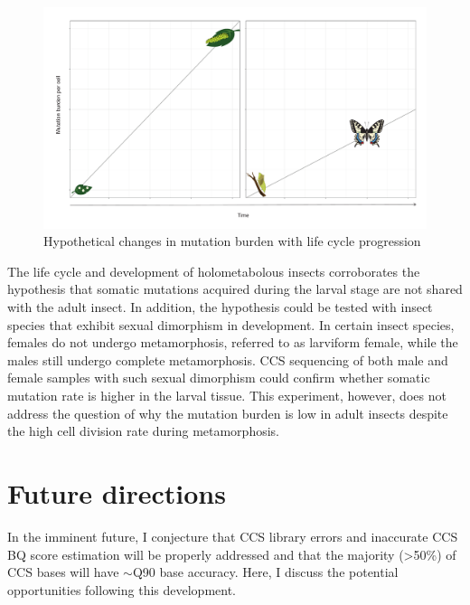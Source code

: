\begin{figure}[h!]
\caption{Hypothetical changes in mutation burden with life cycle progression}
\label{figure:lepidoptera-mutation-burden}
\begin{centering}
\includegraphics[width=\textwidth]{lepidoptera_mutation_burden.pdf} 
\end{centering}
\end{figure}

The life cycle and development of holometabolous insects corroborates the hypothesis that somatic mutations acquired during the larval stage are not shared with the adult insect. In addition, the hypothesis could be tested with insect species that exhibit sexual dimorphism in development. In certain insect species, females do not undergo metamorphosis, referred to as larviform female, while the males still undergo complete metamorphosis. CCS sequencing of both male and female samples with such sexual dimorphism could confirm whether somatic mutation rate is higher in the larval tissue. This experiment, however, does not address the question of why the mutation burden is low in adult insects despite the high cell division rate during metamorphosis. 

\section{Future directions}

In the imminent future, I conjecture that CCS library errors and inaccurate CCS BQ score estimation will be properly addressed and that the majority (>50\%) of CCS bases will have $\sim$Q90 base accuracy. Here, I discuss the potential opportunities following this development.

